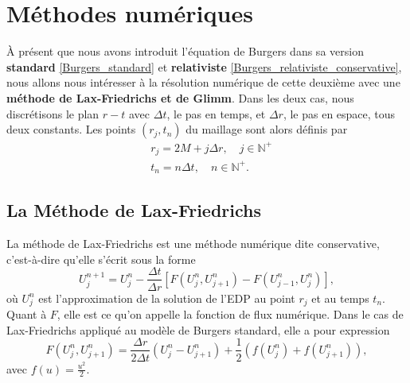 \documentclass[11pt,a4paper]{article}
\begin{document}
\section{Méthodes numériques}

\`{A} présent que nous avons introduit l'équation de Burgers dans sa version \textbf{standard} \eqref{Burgers_standard} et \textbf{relativiste} \eqref{Burgers_relativiste_conservative}, nous allons nous intéresser à la résolution numérique de cette deuxième avec une \textbf{méthode de Lax-Friedrichs et de Glimm}. Dans les deux cas, nous discrétisons le plan $r-t$ avec $\Delta t$, le pas en temps, et $\Delta r$, le pas en espace, tous deux constants. Les points $(r_j, t_n)$ du maillage sont alors définis par
\begin{align}
	&r_j = 2M + j \Delta r, \quad j\in\mathbb{N^+}\\
	&t_n = n\Delta t, \quad n \in \mathbb{N}^+.
\end{align}

\subsection{La Méthode de Lax-Friedrichs}

La méthode de Lax-Friedrichs est une méthode numérique dite conservative, c'est-à-dire qu'elle s'écrit sous la forme
\begin{equation}\label{methode_conservative}
	U^{n+1}_j = U_j^n - \frac{\Delta t}{\Delta r}\left[F\left(U^n_j, U^n_{j+1}\right) - F\left(U^n_{j-1}, U^n_j\right)\right],
\end{equation}
où $U^n_j$ est l'approximation de la solution de l'EDP au point $r_j$ et au temps $t_n$. Quant à $F$, elle est ce qu'on appelle la fonction de flux numérique. Dans le cas de Lax-Friedrichs appliqué au modèle de Burgers standard, elle a pour expression \cite{leveque1992numerical} 
\begin{equation}
	F\left(U_j^n, U^n_{j+1}\right) = \frac{\Delta r}{2\Delta t}\left(U^n_j - U^n_{j+1}\right) + \frac{1}{2}\left(f(U^n_j) + f(U^n_{j+1})\right),
\end{equation}
avec $f(u)= \frac{u^2}{2}$.
\end{document}
